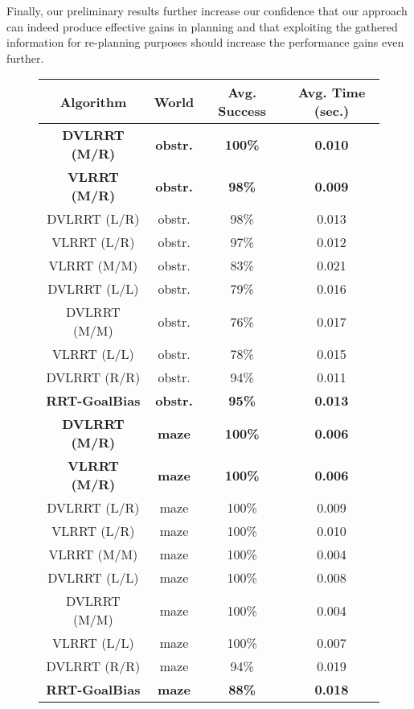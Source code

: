\documentclass[10pt,twoside,twocolumn]{article}
\begin{document}

Finally, our preliminary results further increase our confidence that our approach can indeed produce effective gains in
planning and that exploiting the gathered information for re-planning purposes should increase the performance gains
even further.

\begin{figure}[tp]
\begin{center}
\footnotesize{
\begin{tabular}{|cccc|}
\hline
Algorithm & World & Avg. Success & Avg. Time (sec.)\\
\hline
\bf{DVLRRT (M/R)} & \bf{obstr.} & \bf{100\%} & \bf{0.010}\\
\bf{VLRRT (M/R)} & \bf{obstr.} & \bf{98\%} & \bf{0.009} \\
DVLRRT (L/R) & obstr. & 98\% & 0.013 \\
VLRRT (L/R) & obstr. & 97\% & 0.012\\
VLRRT (M/M) & obstr. & 83\% & 0.021\\
DVLRRT (L/L) & obstr. & 79\% & 0.016\\
DVLRRT (M/M) & obstr. & 76\% & 0.017\\
VLRRT (L/L) & obstr. & 78\% & 0.015\\
DVLRRT (R/R) & obstr. & 94\% & 0.011\\
\bf{RRT-GoalBias} & \bf{obstr.} & \bf{95\%} & \bf{0.013}\\
\hline
\bf{DVLRRT (M/R)} & \bf{maze} & \bf{100\%} & \bf{0.006}\\
\bf{VLRRT (M/R)} & \bf{maze} & \bf{100\%} & \bf{0.006} \\
DVLRRT (L/R) & maze & 100\% & 0.009 \\
VLRRT (L/R) & maze & 100\% & 0.010\\
VLRRT (M/M) & maze & 100\% & 0.004\\
DVLRRT (L/L) & maze & 100\% & 0.008\\
DVLRRT (M/M) & maze & 100\% & 0.004\\
VLRRT (L/L) & maze & 100\% & 0.007\\
DVLRRT (R/R) & maze & 94\% & 0.019\\
\bf{RRT-GoalBias} & \bf{maze} & \bf{88\%} & \bf{0.018}\\

\end{tabular}}
\end{center}
\end{figure}
\end{document}
